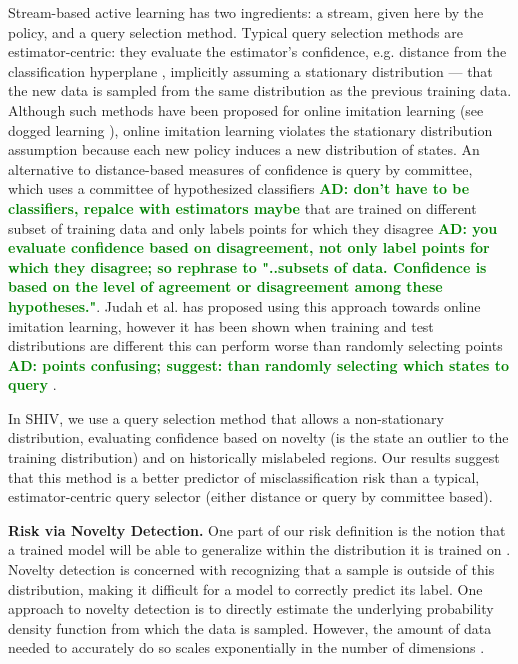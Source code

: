 \documentclass[10pt, conference]{ieeeconf}      %
\newcommand{\adnote}[1]{\ifthenelse{\boolean{include-notes}}%
 {\textcolor{green}{\textbf{AD: #1}}}{}}
\begin{document}
Stream-based active learning has two ingredients: a stream, given here by the policy, and a query selection method. Typical query selection methods are estimator-centric: they evaluate the estimator's confidence, e.g. distance from the classification hyperplane \cite{tong2002support}, implicitly assuming a stationary distribution --- that the new data is sampled from the same distribution as the previous training data. Although such methods have been proposed for online imitation learning (see dogged learning \cite{chernova2009interactive,grollman2007dogged}),
online imitation learning violates the stationary distribution assumption because each new policy induces a new distribution of states. An alternative to distance-based measures of confidence is query by committee, which uses a committee of hypothesized classifiers\adnote{don't have to be classifiers, repalce with estimators maybe} that are trained on different subset of training data and only labels points for which they disagree\adnote{you evaluate confidence based on disagreement, not only label points for which they disagree; so rephrase to "..subsets of data. Confidence is based on the level of agreement or disagreement among these hypotheses."}. Judah et al. has proposed using this approach towards online imitation learning\cite{judah2011active,judah2012active}, however it has been shown when training and test distributions are different this can perform worse than randomly selecting points\adnote{points confusing; suggest: than randomly selecting which states to query} \cite{burbidge2007active}.


In SHIV, we use a query selection method that allows a non-stationary distribution, evaluating confidence based on novelty (is the state an outlier to the training distribution)
and on historically mislabeled regions. %
Our results suggest that this method is a better predictor of misclassification risk than a typical, estimator-centric query selector (either distance or query by committee based).


\noindent\textbf{Risk via Novelty Detection.}
One part of our risk definition is the notion that a trained model will be able to generalize within the distribution it is
trained on \cite{tokdar2010importance}. Novelty detection \cite{hodge2004survey} is concerned with recognizing that a sample is outside of this distribution, making it difficult for a model to correctly predict its label.
One approach to novelty detection is to directly estimate the underlying probability density function from which the data is sampled. However, the amount of data needed to accurately do so scales exponentially in the number of dimensions \cite{nadaraya1964estimating}.
\end{document}
